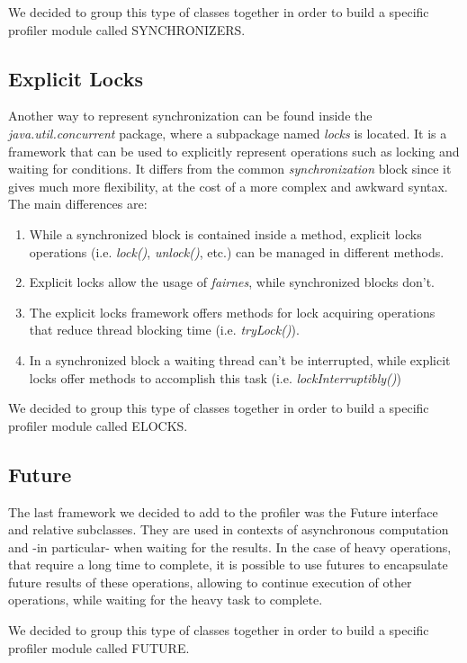 \documentclass[]{usiinfthesis}
\begin{document}
\noindent
We decided to group this type of classes together in order to build a specific profiler module called SYNCHRONIZERS.


\subsection{Explicit Locks}
Another way to represent synchronization can be found inside the \textit{java.util.concurrent} package, where a subpackage named \textit{locks} is located. It is a framework that can be used to explicitly represent operations such as locking and waiting for conditions. It differs from the common \textit{synchronization} block since it gives much more flexibility, at the cost of a more complex and awkward syntax. The main differences are:
\begin{enumerate}
    \item While a synchronized block is contained inside a method, explicit locks operations (i.e. \textit{lock()}, \textit{unlock()}, etc.) can be managed in different methods.
    \item Explicit locks allow the usage of \textit{fairnes}, while synchronized blocks don't.
    \item The explicit locks framework offers methods for lock acquiring operations that reduce thread blocking time (i.e. \textit{tryLock()}).
    \item In a synchronized block a waiting thread can't be interrupted, while explicit locks offer methods to accomplish this task (i.e. \textit{lockInterruptibly()})
\end{enumerate}

\noindent
We decided to group this type of classes together in order to build a specific profiler module called ELOCKS.

\subsection{Future}
The last framework we decided to add to the profiler was the Future interface and relative subclasses. They are used in contexts of asynchronous computation and -in particular- when waiting for the results. In the case of heavy operations, that require a long time to complete, it is possible to use futures to encapsulate future results of these operations, allowing to continue execution of other operations, while waiting for the heavy task to complete.

\noindent
We decided to group this type of classes together in order to build a specific profiler module called FUTURE.
\end{document}
